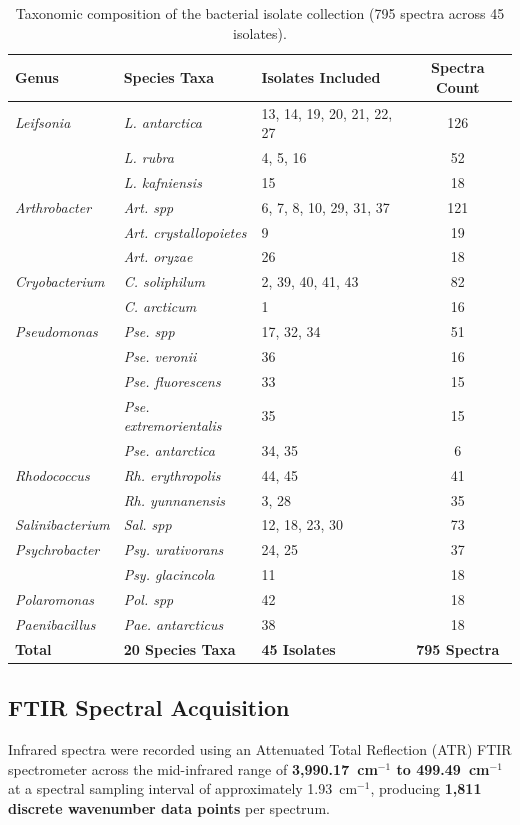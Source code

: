 \documentclass[11pt,a4paper]{article}
\begin{document}
\begin{table}[H]
\centering
\caption{Taxonomic composition of the bacterial isolate collection (795 spectra across 45 isolates).}
\label{tab:strains}
\small
\begin{tabular}{lllc}
\toprule
\textbf{Genus} & \textbf{Species Taxa} & \textbf{Isolates Included} & \textbf{Spectra Count} \\
\midrule
\textit{Leifsonia} & \textit{L. antarctica} & 13, 14, 19, 20, 21, 22, 27 & 126 \\
 & \textit{L. rubra} & 4, 5, 16 & 52 \\
 & \textit{L. kafniensis} & 15 & 18 \\
\textit{Arthrobacter} & \textit{Art. spp} & 6, 7, 8, 10, 29, 31, 37 & 121 \\
 & \textit{Art. crystallopoietes} & 9 & 19 \\
 & \textit{Art. oryzae} & 26 & 18 \\
\textit{Cryobacterium} & \textit{C. soliphilum} & 2, 39, 40, 41, 43 & 82 \\
 & \textit{C. arcticum} & 1 & 16 \\
\textit{Pseudomonas} & \textit{Pse. spp} & 17, 32, 34 & 51 \\
 & \textit{Pse. veronii} & 36 & 16 \\
 & \textit{Pse. fluorescens} & 33 & 15 \\
 & \textit{Pse. extremorientalis} & 35 & 15 \\
 & \textit{Pse. antarctica} & 34, 35 & 6 \\
\textit{Rhodococcus} & \textit{Rh. erythropolis} & 44, 45 & 41 \\
 & \textit{Rh. yunnanensis} & 3, 28 & 35 \\
\textit{Salinibacterium} & \textit{Sal. spp} & 12, 18, 23, 30 & 73 \\
\textit{Psychrobacter} & \textit{Psy. urativorans} & 24, 25 & 37 \\
 & \textit{Psy. glacincola} & 11 & 18 \\
\textit{Polaromonas} & \textit{Pol. spp} & 42 & 18 \\
\textit{Paenibacillus} & \textit{Pae. antarcticus} & 38 & 18 \\
\bottomrule
\textbf{Total} & \textbf{20 Species Taxa} & \textbf{45 Isolates} & \textbf{795 Spectra} \\
\bottomrule
\end{tabular}
\end{table}

\subsection{FTIR Spectral Acquisition}
Infrared spectra were recorded using an Attenuated Total Reflection (ATR) FTIR spectrometer across the mid-infrared range of \textbf{3,990.17~cm$^{-1}$ to 499.49~cm$^{-1}$} at a spectral sampling interval of approximately 1.93~cm$^{-1}$, producing \textbf{1,811 discrete wavenumber data points} per spectrum.
\end{document}
